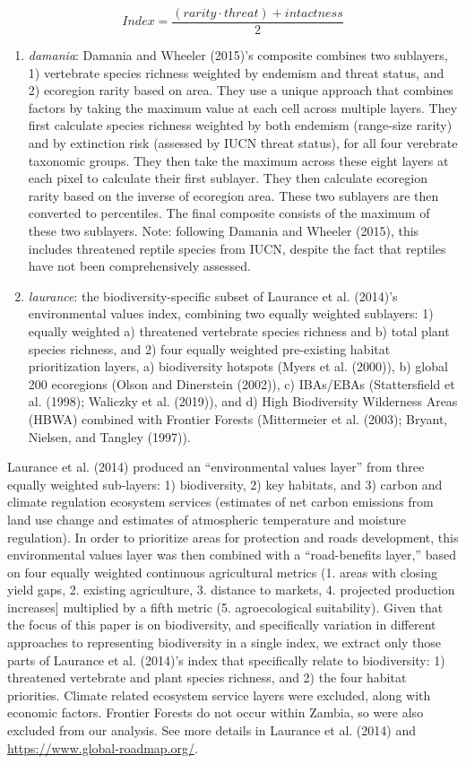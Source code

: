 \documentclass[
]{article}
\begin{document}
\[ Index = \frac{(rarity \cdot threat) + intactness}{2} \]

\begin{enumerate}
\def\labelenumi{(\arabic{enumi})}
\setcounter{enumi}{1}
\item
  \emph{damania}: Damania and Wheeler (2015)'s composite combines two sublayers, 1) vertebrate species richness weighted by endemism and threat status, and 2) ecoregion rarity based on area. They use a unique approach that combines factors by taking the maximum value at each cell across multiple layers. They first calculate species richness weighted by both endemism (range-size rarity) and by extinction risk (assessed by IUCN threat status), for all four verebrate taxonomic groups. They then take the maximum across these eight layers at each pixel to calculate their first sublayer. They then calculate ecoregion rarity based on the inverse of ecoregion area. These two sublayers are then converted to percentiles. The final composite consists of the maximum of these two sublayers. Note: following Damania and Wheeler (2015), this includes threatened reptile species from IUCN, despite the fact that reptiles have not been comprehensively assessed.
\item
  \emph{laurance}: the biodiversity-specific subset of Laurance et al. (2014)'s environmental values index, combining two equally weighted sublayers: 1) equally weighted a) threatened vertebrate species richness and b) total plant species richness, and 2) four equally weighted pre-existing habitat prioritization layers, a) biodiversity hotspots (Myers et al. (2000)), b) global 200 ecoregions (Olson and Dinerstein (2002)), c) IBAs/EBAs (Stattersfield et al. (1998); Waliczky et al. (2019)), and d) High Biodiversity Wilderness Areas (HBWA) combined with Frontier Forests (Mittermeier et al. (2003); Bryant, Nielsen, and Tangley (1997)).
\end{enumerate}

Laurance et al. (2014) produced an ``environmental values layer'' from three equally weighted sub-layers: 1) biodiversity, 2) key habitats, and 3) carbon and climate regulation ecosystem services (estimates of net carbon emissions from land use change and estimates of atmospheric temperature and moisture regulation). In order to prioritize areas for protection and roads development, this environmental values layer was then combined with a ``road-benefits layer,'' based on four equally weighted continuous agricultural metrics (1. areas with closing yield gaps, 2. existing agriculture, 3. distance to markets, 4. projected production increases{]} multiplied by a fifth metric (5. agroecological suitability). Given that the focus of this paper is on biodiversity, and specifically variation in different approaches to representing biodiversity in a single index, we extract only those parts of Laurance et al. (2014)'s index that specifically relate to biodiversity: 1) threatened vertebrate and plant species richness, and 2) the four habitat priorities. Climate related ecosystem service layers were excluded, along with economic factors. Frontier Forests do not occur within Zambia, so were also excluded from our analysis. See more details in Laurance et al. (2014) and \url{https://www.global-roadmap.org/}.
\end{document}
